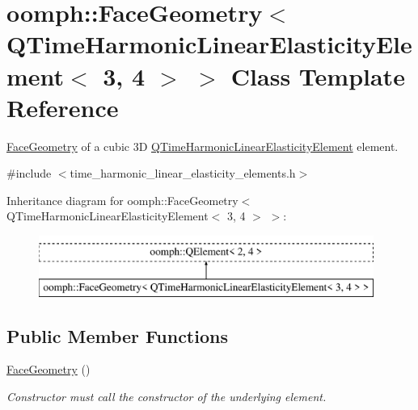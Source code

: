 \hypertarget{classoomph_1_1FaceGeometry_3_01QTimeHarmonicLinearElasticityElement_3_013_00_014_01_4_01_4}{}\section{oomph\+:\+:Face\+Geometry$<$ Q\+Time\+Harmonic\+Linear\+Elasticity\+Element$<$ 3, 4 $>$ $>$ Class Template Reference}
\label{classoomph_1_1FaceGeometry_3_01QTimeHarmonicLinearElasticityElement_3_013_00_014_01_4_01_4}


\hyperlink{classoomph_1_1FaceGeometry}{Face\+Geometry} of a cubic 3D \hyperlink{classoomph_1_1QTimeHarmonicLinearElasticityElement}{Q\+Time\+Harmonic\+Linear\+Elasticity\+Element} element.  




{\ttfamily \#include $<$time\+\_\+harmonic\+\_\+linear\+\_\+elasticity\+\_\+elements.\+h$>$}

Inheritance diagram for oomph\+:\+:Face\+Geometry$<$ Q\+Time\+Harmonic\+Linear\+Elasticity\+Element$<$ 3, 4 $>$ $>$\+:\begin{figure}[H]
\begin{center}
\leavevmode
\includegraphics[height=2.000000cm]{classoomph_1_1FaceGeometry_3_01QTimeHarmonicLinearElasticityElement_3_013_00_014_01_4_01_4}
\end{center}
\end{figure}
\subsection*{Public Member Functions}
\begin{DoxyCompactItemize}
\item 
\hyperlink{classoomph_1_1FaceGeometry_3_01QTimeHarmonicLinearElasticityElement_3_013_00_014_01_4_01_4_aa9c2b01d55fb4e6369489722d272a2b1}{Face\+Geometry} ()
\begin{DoxyCompactList}\small\item\em Constructor must call the constructor of the underlying element. \end{DoxyCompactList}\end{DoxyCompactItemize}


